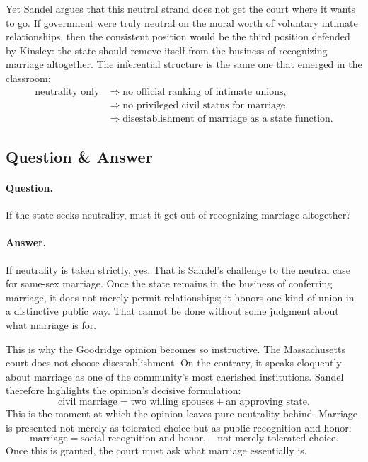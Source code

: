Yet Sandel argues that this neutral strand does not get the court where it wants to go. If government were truly neutral on the moral worth of voluntary intimate relationships, then the consistent position would be the third position defended by Kinsley: the state should remove itself from the business of recognizing marriage altogether. The inferential structure is the same one that emerged in the classroom:
\begin{align}
\text{neutrality only}
&\Longrightarrow
\text{no official ranking of intimate unions},\\
&\Longrightarrow
\text{no privileged civil status for marriage},\\
&\Longrightarrow
\text{disestablishment of marriage as a state function}.
\end{align}

\subsection{Question \& Answer}

\paragraph{Question.} If the state seeks neutrality, must it get out of recognizing marriage altogether?

\paragraph{Answer.} If neutrality is taken strictly, yes. That is Sandel's challenge to the neutral case for same-sex marriage. Once the state remains in the business of conferring marriage, it does not merely permit relationships; it honors one kind of union in a distinctive public way. That cannot be done without some judgment about what marriage is for.

This is why the Goodridge opinion becomes so instructive. The Massachusetts court does not choose disestablishment. On the contrary, it speaks eloquently about marriage as one of the community's most cherished institutions. Sandel therefore highlights the opinion's decisive formulation:
\begin{equation}
\text{civil marriage}
=
\text{two willing spouses} + \text{an approving state}.
\end{equation}
This is the moment at which the opinion leaves pure neutrality behind. Marriage is presented not merely as tolerated choice but as public recognition and honor:
\begin{equation}
\text{marriage}
=
\text{social recognition and honor},
\quad
\text{not merely tolerated choice}.
\end{equation}
Once this is granted, the court must ask what marriage essentially is.

